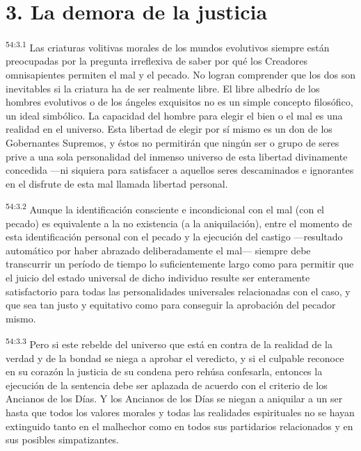 \section*{3. La demora de la justicia}
\par
\textsuperscript{54:3.1} Las criaturas volitivas morales de los mundos evolutivos siempre están preocupadas por la pregunta irreflexiva de saber por qué los Creadores omnisapientes permiten el mal y el pecado. No logran comprender que los dos son inevitables si la criatura ha de ser realmente libre. El libre albedrío de los hombres evolutivos o de los ángeles exquisitos no es un simple concepto filosófico, un ideal simbólico. La capacidad del hombre para elegir el bien o el mal es una realidad en el universo. Esta libertad de elegir por sí mismo es un don de los Gobernantes Supremos, y éstos no permitirán que ningún ser o grupo de seres prive a una sola personalidad del inmenso universo de esta libertad divinamente concedida ---ni siquiera para satisfacer a aquellos seres descaminados e ignorantes en el disfrute de esta mal llamada libertad personal.

\par
\textsuperscript{54:3.2} Aunque la identificación consciente e incondicional con el mal
(con el pecado) es equivalente a la no existencia (a la aniquilación), entre el momento de esta identificación personal con el pecado y la ejecución del castigo ---resultado automático por haber abrazado deliberadamente el mal--- siempre debe transcurrir un período de tiempo lo suficientemente largo como para permitir que el juicio del estado universal de dicho individuo resulte ser enteramente satisfactorio para todas las personalidades universales relacionadas con el caso, y que sea tan justo y equitativo como para conseguir la aprobación del pecador mismo.

\par
\textsuperscript{54:3.3} Pero si este rebelde del universo que está en contra de la realidad de la verdad y de la bondad se niega a aprobar el veredicto, y si el culpable reconoce en su corazón la justicia de su condena pero rehúsa confesarla, entonces la ejecución de la sentencia debe ser aplazada de acuerdo con el criterio de los Ancianos de los Días. Y los Ancianos de los Días se niegan a aniquilar a un ser hasta que todos los valores morales y todas las realidades espirituales no se hayan extinguido tanto en el malhechor como en todos sus partidarios relacionados y en sus posibles simpatizantes.

